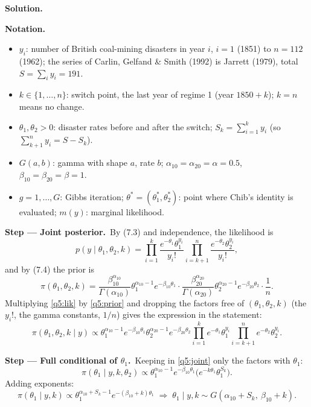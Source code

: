 \documentclass[11pt,a4paper]{article}
\numberwithin{equation}{questao}   %
\newenvironment{notacao}{\par\smallskip\noindent\textbf{Notation.}\begin{itemize}[leftmargin=1.4em,topsep=1pt,itemsep=0pt]\small}{\end{itemize}}
\newcommand{\passo}[2]{\par\smallskip\noindent\textbf{Step --- #1.}~#2}
\newcommand{\solhead}{\par\medskip\noindent{\color{blue!55!black}\rule{\linewidth}{0.3pt}}\par\noindent\textbf{Solution.}}
\begin{document}
\begin{sol}
\solhead
\begin{notacao}
\item $y_i$: number of British coal-mining disasters in year $i$, $i=1$ (1851) to $n=112$ (1962);
  the series of Carlin, Gelfand \& Smith (1992) is Jarrett (1979), total $S=\sum_iy_i=191$.
\item $k\in\{1,\dots,n\}$: switch point, the last year of regime 1 (year $1850+k$); $k=n$ means no change.
\item $\theta_1,\theta_2>0$: disaster rates before and after the switch;
  $S_k=\sum_{i=1}^ky_i$ (so $\sum_{k+1}^ny_i=S-S_k$).
\item $G(a,b)$: gamma with shape $a$, rate $b$; $\alpha_{10}=\alpha_{20}=\alpha=0.5$,
  $\beta_{10}=\beta_{20}=\beta=1$.
\item $g=1,\dots,G$: Gibbs iteration; $\theta^*=(\theta_1^*,\theta_2^*)$: point where Chib's
  identity is evaluated; $m(y)$: marginal likelihood.
\end{notacao}

\passo{Joint posterior}{By (7.3) and independence, the likelihood is}
\begin{equation}\label{q5:lik}
p(y\mid\theta_1,\theta_2,k)=\prod_{i=1}^k\frac{e^{-\theta_1}\theta_1^{y_i}}{y_i!}
\prod_{i=k+1}^n\frac{e^{-\theta_2}\theta_2^{y_i}}{y_i!},
\end{equation}
and by (7.4) the prior is
\begin{equation}\label{q5:prior}
\pi(\theta_1,\theta_2,k)=\frac{\beta_{10}^{\alpha_{10}}}{\Gamma(\alpha_{10})}\theta_1^{\alpha_{10}-1}e^{-\beta_{10}\theta_1}
\cdot\frac{\beta_{20}^{\alpha_{20}}}{\Gamma(\alpha_{20})}\theta_2^{\alpha_{20}-1}e^{-\beta_{20}\theta_2}\cdot\frac1n .
\end{equation}
Multiplying \eqref{q5:lik} by \eqref{q5:prior} and dropping the factors free of
$(\theta_1,\theta_2,k)$ (the $y_i!$, the gamma constants, $1/n$) gives the expression in the statement:
\begin{equation}\label{q5:joint}
\pi(\theta_1,\theta_2,k\mid y)\propto\theta_1^{\alpha_{10}-1}e^{-\beta_{10}\theta_1}\theta_2^{\alpha_{20}-1}e^{-\beta_{20}\theta_2}
\prod_{i=1}^{k}e^{-\theta_1}\theta_1^{y_i}\prod_{i=k+1}^{n}e^{-\theta_2}\theta_2^{y_i}.
\end{equation}

\passo{Full conditional of $\theta_1$}{Keeping in \eqref{q5:joint} only the factors with $\theta_1$:}
\[
\pi(\theta_1\mid y,k,\theta_2)\propto\theta_1^{\alpha_{10}-1}e^{-\beta_{10}\theta_1}\big(e^{-k\theta_1}\theta_1^{S_k}\big).
\]
Adding exponents:
\begin{equation}\label{q5:t1}
\pi(\theta_1\mid y,k)\propto\theta_1^{\alpha_{10}+S_k-1}e^{-(\beta_{10}+k)\theta_1}
\;\Longrightarrow\;\theta_1\mid y,k\sim G(\alpha_{10}+S_k,\ \beta_{10}+k).
\end{equation}


\end{sol}
\end{document}
